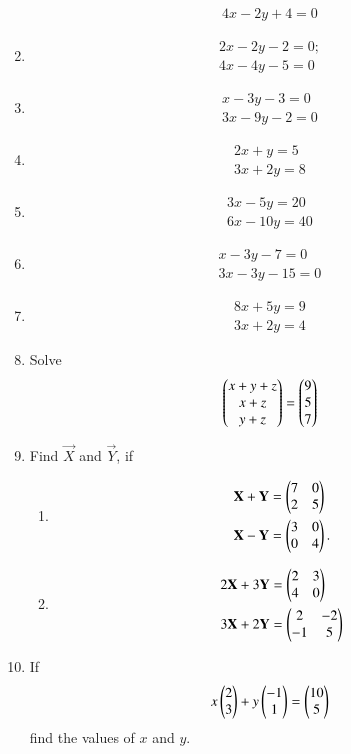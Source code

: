\begin{enumerate}[label=\thesubsection.\arabic*,ref=\thesubsection.\theenumi]
\begin{align}
 	4x-2y+4=0
	\end{align}
\item \begin{align}
	2x-2y-2=0;\\
	4x-4y-5=0
	\end{align}
	\item \begin{align}
	x-3y-3=0\\
	3x-9y-2=0
        \end{align}
       \item \begin{align}
	2x+y=5\\
	3x+2y=8
	\end{align}
	\item \begin{align}
	3x-5y=20\\
	6x-10y=40
	\end{align}
	\item \begin{align}
	x-3y-7=0\\
	3x-3y-15=0
        \end{align}
\item \begin{align}
8x+5y=9
\\ 3x+2y=4
\end{align}
\item Solve
\begin{align}
\begin{pmatrix}x+y+z \\ x+z \\ y+z \end{pmatrix}=
\begin{pmatrix}9 \\ 5 \\  7\end{pmatrix}
\end{align}
\item Find $\vec{X}$ and $\vec{Y}$, if
\begin{enumerate}
\item 
\begin{align}
	\mathbf{X}+\mathbf{Y}&= \begin{pmatrix}7 & 0 \\ 2 & 5\end{pmatrix} 
\\
		\mathbf{X}-\mathbf{Y}&=\begin{pmatrix}3 & 0 \\ 0 & 4\end{pmatrix}.
\end{align}
\item 
\begin{align}
	2\mathbf{X}+3\mathbf{Y}&=\begin{pmatrix}2 & 3 \\ 4 & 0\end{pmatrix}  
	\\
	3\mathbf{X}+2\mathbf{Y}&=\begin{pmatrix}2 & -2 \\ -1 & 5\end{pmatrix}
\end{align}
\end{enumerate}
\item If 
\begin{align}
	x \begin{pmatrix}2 \\ 3\end{pmatrix} + y \begin{pmatrix}-1 \\ 1\end{pmatrix}= \begin{pmatrix}10 \\ 5\end{pmatrix}
\end{align}
find the values of $x$ and $y$.
\end{enumerate}
